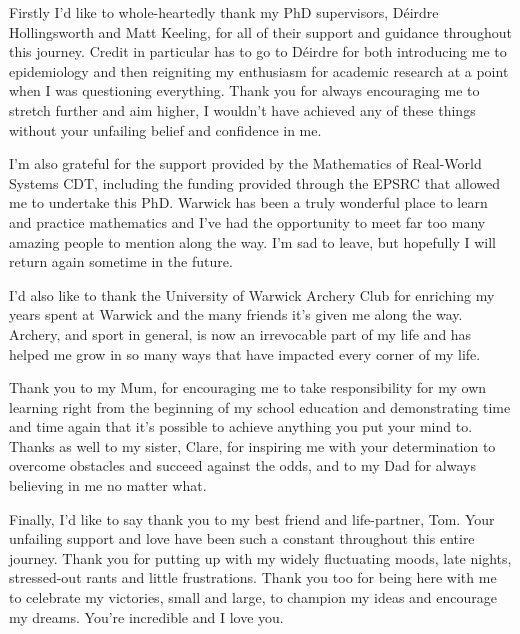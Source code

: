 \documentclass[11pt,a4paper]{report}      %
\begin{document}
\begin{thesisacknowledgments}
Firstly I'd like to whole-heartedly thank my PhD supervisors, D\'eirdre Hollingsworth and Matt Keeling, for all of their support and guidance throughout this journey. Credit in particular has to go to D\'eirdre for both introducing me to epidemiology and then reigniting my enthusiasm for academic research at a point when I was questioning everything. Thank you for always encouraging me to stretch further and aim higher, I wouldn't have achieved any of these things without your unfailing belief and confidence in me. 

I'm also grateful for the support provided by the Mathematics of Real-World Systems CDT, including the funding provided through the EPSRC that allowed me to undertake this PhD. Warwick has been a truly wonderful place to learn and practice mathematics and I've had the opportunity to meet far too many amazing people to mention along the way. I'm sad to leave, but hopefully I will return again sometime in the future.

I'd also like to thank the University of Warwick Archery Club for enriching my years spent at Warwick and the many friends it's given me along the way. Archery, and sport in general, is now an irrevocable part of my life and has helped me grow in so many ways that have impacted every corner of my life.

Thank you to my Mum, for encouraging me to take responsibility for my own learning right from the beginning of my school education and demonstrating time and time again that it's possible to achieve anything you put your mind to. Thanks as well to my sister, Clare, for inspiring me with your determination to overcome obstacles and succeed against the odds, and to my Dad for always believing in me no matter what.

Finally, I'd like to say thank you to my best friend and life-partner, Tom. Your unfailing support and love have been such a constant throughout this entire journey. Thank you for putting up with my widely fluctuating moods, late nights, stressed-out rants and little frustrations. Thank you too for being here with me to celebrate my victories, small and large, to champion my ideas and encourage my dreams. You're incredible and I love you.


%                   
\end{thesisacknowledgments}
\end{document}
